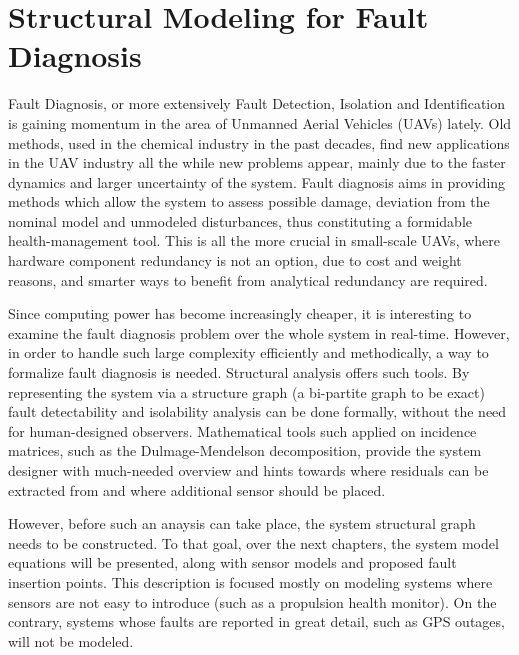 \chapter{Structural Modeling for Fault Diagnosis}

Fault Diagnosis, or more extensively Fault Detection, Isolation and Identification is gaining momentum in the area of Unmanned Aerial Vehicles (UAVs) lately. Old methods, used in the chemical industry in the past decades, find new applications in the UAV industry all the while new problems appear, mainly due to the faster dynamics and larger uncertainty of the system.
Fault diagnosis aims in providing methods which allow the system to assess possible damage, deviation from the nominal model and unmodeled disturbances, thus constituting a formidable health-management tool. This is all the more crucial in small-scale UAVs, where hardware component redundancy is not an option, due to cost and weight reasons, and smarter ways to benefit from analytical redundancy are required.

Since computing power has become increasingly cheaper, it is interesting to examine the fault diagnosis problem over the whole system in real-time. However, in order to handle such large complexity efficiently and methodically, a way to formalize fault diagnosis is needed. Structural analysis offers such tools. By representing the system via a structure graph (a bi-partite graph to be exact) fault detectability and isolability analysis can be done formally, without the need for human-designed observers. Mathematical tools such applied on incidence matrices, such as the Dulmage-Mendelson decomposition, provide the system designer with much-needed overview and hints towards where residuals can be extracted from and where additional sensor should be placed.

However, before such an anaysis can take place, the system structural graph needs to be constructed. To that goal, over the next chapters, the system model equations will be presented, along with sensor models and proposed fault insertion points. This description is focused mostly on modeling systems where sensors are not easy to introduce (such as a propulsion health monitor). On the contrary, systems whose faults are reported in great detail, such as GPS outages, will not be modeled.